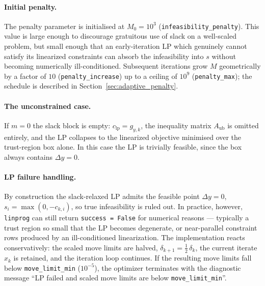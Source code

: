 \paragraph{Initial penalty.}
The penalty parameter is initialised at
$M_0 = 10^3$ (\texttt{infeasibility\_penalty}). This value is large
enough to discourage gratuitous use of slack on a well-scaled
problem, but small enough that an early-iteration LP which genuinely
cannot satisfy its linearized constraints can absorb the infeasibility
into $s$ without becoming numerically ill-conditioned. Subsequent
iterations grow $M$ geometrically by a factor of $10$
(\texttt{penalty\_increase}) up to a ceiling of $10^9$
(\texttt{penalty\_max}); the schedule is described in
Section~\ref{sec:adaptive_penalty}.

\paragraph{The unconstrained case.}
If $m = 0$ the slack block is empty: $c_{\mathrm{lp}} = g_{y,k}$, the
inequality matrix $A_{\mathrm{ub}}$ is omitted entirely, and the LP
collapses to the linearized objective minimised over the trust-region
box alone. In this case the LP is trivially feasible, since the box
always contains $\Delta y = 0$.

\paragraph{LP failure handling.}
By construction the slack-relaxed LP admits the feasible point
$\Delta y = 0$, $s_i = \max(0, -c_{k,i})$, so true infeasibility is
ruled out. In practice, however, \texttt{linprog} can still return
\texttt{success = False} for numerical reasons --- typically a trust
region so small that the LP becomes degenerate, or near-parallel
constraint rows produced by an ill-conditioned linearization. The
implementation reacts conservatively: the scaled move limits are
halved, $\delta_{k+1} = \tfrac{1}{2}\,\delta_k$, the current iterate
$x_k$ is retained, and the iteration loop continues. If the resulting
move limits fall below \texttt{move\_limit\_min} ($10^{-5}$), the
optimizer terminates with the diagnostic message ``LP failed and
scaled move limits are below \texttt{move\_limit\_min}''.

